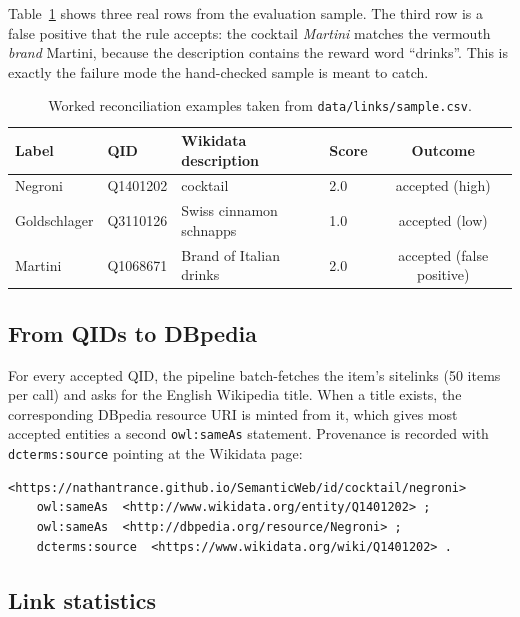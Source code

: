 Table~\ref{tab:reconcile-examples} shows three real rows from the evaluation
sample. The third row is a false positive that the rule accepts: the cocktail
\emph{Martini} matches the vermouth \emph{brand} Martini, because the
description contains the reward word ``drinks''. This is exactly the failure
mode the hand-checked sample is meant to catch.

\begin{table}[h]
  \centering
  \small
  \begin{tabular}{@{}llllc@{}}
    \toprule
    Label & QID & Wikidata description & Score & Outcome \\
    \midrule
    Negroni & Q1401202 & cocktail & 2.0 & accepted (high) \\
    Goldschlager & Q3110126 & Swiss cinnamon schnapps & 1.0 & accepted (low) \\
    Martini & Q1068671 & Brand of Italian drinks & 2.0 & accepted (false positive) \\
    \bottomrule
  \end{tabular}
  \caption{Worked reconciliation examples taken from
  \texttt{data/links/sample.csv}.}
  \label{tab:reconcile-examples}
\end{table}

\subsection{From QIDs to DBpedia}

For every accepted QID, the pipeline batch-fetches the item's sitelinks (50
items per call) and asks for the English Wikipedia title. When a title exists,
the corresponding DBpedia resource URI is minted from it, which gives most
accepted entities a second \texttt{owl:sameAs} statement. Provenance is
recorded with \texttt{dcterms:source} pointing at the Wikidata page:

\begin{lstlisting}[frame=single, basicstyle=\ttfamily\small]
<https://nathantrance.github.io/SemanticWeb/id/cocktail/negroni>
    owl:sameAs  <http://www.wikidata.org/entity/Q1401202> ;
    owl:sameAs  <http://dbpedia.org/resource/Negroni> ;
    dcterms:source  <https://www.wikidata.org/wiki/Q1401202> .
\end{lstlisting}

\subsection{Link statistics}

